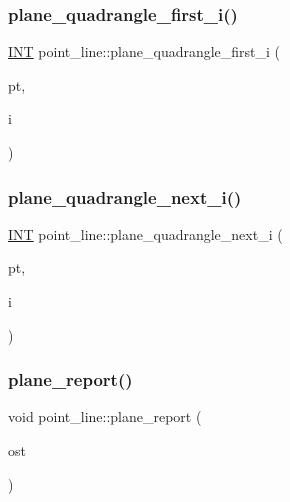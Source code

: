 \subsubsection{\texorpdfstring{plane\+\_\+quadrangle\+\_\+first\+\_\+i()}{plane\_quadrangle\_first\_i()}}
{\footnotesize\ttfamily \mbox{\hyperlink{galois_8h_a09fddde158a3a20bd2dcadb609de11dc}{I\+NT}} point\+\_\+line\+::plane\+\_\+quadrangle\+\_\+first\+\_\+i (\begin{DoxyParamCaption}\item[{\mbox{\hyperlink{galois_8h_a09fddde158a3a20bd2dcadb609de11dc}{I\+NT}} $\ast$}]{pt,  }\item[{\mbox{\hyperlink{galois_8h_a09fddde158a3a20bd2dcadb609de11dc}{I\+NT}}}]{i }\end{DoxyParamCaption})}

\mbox{\label{classpoint__line_a8a007873e6f93cb7bde36848ecaa50bf}} 
\subsubsection{\texorpdfstring{plane\+\_\+quadrangle\+\_\+next\+\_\+i()}{plane\_quadrangle\_next\_i()}}
{\footnotesize\ttfamily \mbox{\hyperlink{galois_8h_a09fddde158a3a20bd2dcadb609de11dc}{I\+NT}} point\+\_\+line\+::plane\+\_\+quadrangle\+\_\+next\+\_\+i (\begin{DoxyParamCaption}\item[{\mbox{\hyperlink{galois_8h_a09fddde158a3a20bd2dcadb609de11dc}{I\+NT}} $\ast$}]{pt,  }\item[{\mbox{\hyperlink{galois_8h_a09fddde158a3a20bd2dcadb609de11dc}{I\+NT}}}]{i }\end{DoxyParamCaption})}

\mbox{\label{classpoint__line_aba3d273ac380fda6135d9376be29c1bc}} 
\subsubsection{\texorpdfstring{plane\+\_\+report()}{plane\_report()}}
{\footnotesize\ttfamily void point\+\_\+line\+::plane\+\_\+report (\begin{DoxyParamCaption}\item[{ostream \&}]{ost }\end{DoxyParamCaption})}

